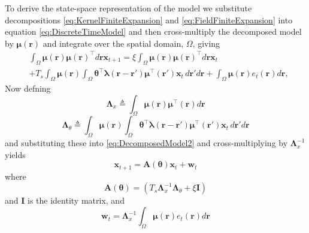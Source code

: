 \documentclass[journal,a4paper]{IEEEtran}
\begin{document}
To derive the state-space representation of the model we substitute decompositions \eqref{eq:KernelFiniteExpansion} and \eqref{eq:FieldFiniteExpansion} into equation \eqref{eq:DiscreteTimeModel} and then cross-multiply the decomposed model by $\boldsymbol\mu\left(\mathbf r\right)$ and integrate over the spatial domain, $\Omega$, giving
\begin{align}\label{eq:DecomposedModel2} 
	&\int_{\Omega} \boldsymbol\mu  \left(\mathbf{r}\right)\boldsymbol\mu\left(\mathbf{r}\right)^\top  d\mathbf{r}\mathbf{x}_{t+1}= 
	\xi\int_{\Omega}\boldsymbol\mu\left(\mathbf{r}\right)\boldsymbol\mu\left(\mathbf{r}\right)^\top d\mathbf{r}\mathbf{x}_t \nonumber \\
	&+T_s \int_{\Omega}\boldsymbol\mu\left(\mathbf{r}\right) \int_\Omega { 
	   \boldsymbol\theta^\top\boldsymbol\lambda\left(\mathbf{r}-\mathbf{r'}\right)
	    \boldsymbol\mu^\top\left(\mathbf{r'}\right)\mathbf{x}_t 
	\, d\mathbf{r}'d\mathbf{r}}
	+ \int_{\Omega}\boldsymbol\mu\left(\mathbf{r}\right)e_t\left(\mathbf{r}\right)d\mathbf{r}, 
\end{align}
Now defning 
\begin{equation}\label{eq:Lambdax}
 \mathbf{\Lambda}_{x} \triangleq \int_{\Omega}\boldsymbol\mu\left(\mathbf{r}\right)\boldsymbol\mu^\top\left(\mathbf{r}\right) d\mathbf{r}
\end{equation}
\begin{equation}\label{eq:Lambdatheta}
 \mathbf{\Lambda}_{\theta}\triangleq\int_{\Omega}\boldsymbol\mu\left(\mathbf{r}\right) \int_\Omega { 
	   \boldsymbol\theta^\top\boldsymbol\lambda\left(\mathbf{r}-\mathbf{r'}\right)
	    \boldsymbol\mu^\top\left(\mathbf{r'}\right)\mathbf{x}_t 
	\, d\mathbf{r}'d\mathbf{r}}
\end{equation}
and substituting these into \eqref{eq:DecomposedModel2} and cross-multiplying by $\mathbf{\Lambda}_{x}^{-1}$ yields
\begin{equation}\label{eq:StateEquation}
 \mathbf x_{t+1}=\mathbf A(\boldsymbol \theta) \mathbf x_t+ \mathbf w_t
\end{equation}
where
\begin{equation}\label{eq:A_theta}
 \mathbf A(\boldsymbol \theta)=(T_s\mathbf{\Lambda}_{x}^{-1}\mathbf{\Lambda}_{\theta}+\xi\mathbf I)
\end{equation}
and $\mathbf I$ is the identity matrix, and 
\begin{equation}\label{eq:Disturbance}
\mathbf w_t= \mathbf{\Lambda}_{x}^{-1}\int_{\Omega}\boldsymbol\mu \left(\mathbf{r}\right)e_t\left(\mathbf{r}\right)d\mathbf{r}
\end{equation}
\end{document}
